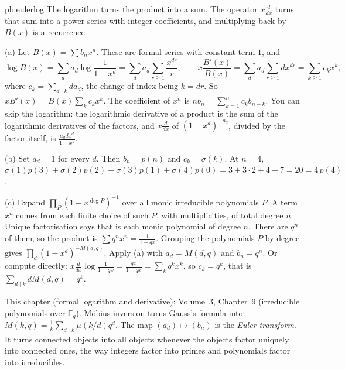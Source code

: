 \begin{solution}{pb:eulerlog}
\idea The logarithm turns the product into a sum. The operator $x\frac d{dx}$ turns that sum into a power series with integer coefficients, and multiplying back by $B(x)$ is a recurrence.

\writeup (a) Let $B(x)=\sum b_nx^n$. These are formal series with constant term $1$, and
\[
\log B(x)=\sum_da_d\log\frac1{1-x^d}=\sum_da_d\sum_{r\ge1}\frac{x^{dr}}r,\qquad x\frac{B'(x)}{B(x)}=\sum_da_d\sum_{r\ge1}dx^{dr}=\sum_{k\ge1}c_kx^k,
\]
where $c_k=\sum_{d\mid k}da_d$, the change of index being $k=dr$. So $xB'(x)=B(x)\sum_kc_kx^k$. The coefficient of $x^n$ is
$nb_n=\sum_{k=1}^nc_kb_{n-k}$. You can skip the logarithm: the logarithmic derivative of a product is the sum of the logarithmic
derivatives of the factors, and $x\frac d{dx}$ of $(1-x^d)^{-a_d}$, divided by the factor itself, is $\frac{a_ddx^d}{1-x^d}$.

(b) Set $a_d=1$ for every $d$. Then $b_n=p(n)$ and $c_k=\sigma(k)$. At $n=4$,
$\sigma(1)p(3)+\sigma(2)p(2)+\sigma(3)p(1)+\sigma(4)p(0)
=3+3\cdot2+4+7=20=4\,p(4)$.

(c) Expand $\prod_P(1-x^{\deg P})^{-1}$ over all monic irreducible polynomials $P$. A term $x^n$ comes from each finite choice of such $P$, with
multiplicities, of total degree $n$. Unique factorisation says that is each monic polynomial of degree $n$. There are $q^n$ of
them, so the product is $\sum q^nx^n=\frac1{1-qx}$. Grouping the polynomials $P$ by degree gives $\prod_d(1-x^d)^{-M(d,q)}$. Apply
(a) with $a_d=M(d,q)$ and $b_n=q^n$. Or compute directly: $x\frac{d}{dx}\log\frac1{1-qx}=\frac{qx}{1-qx}=\sum_kq^kx^k$, so $c_k=q^k$, that is
$\sum_{d\mid k}dM(d,q)=q^k$.

\tools This chapter (formal logarithm and derivative); Volume~3, Chapter~9 (irreducible polynomials over $\mathbb F_q$).
\leads Möbius inversion turns Gauss's formula into $M(k,q)=\frac1k\sum_{d\mid k}\mu(k/d)q^d$. The map $(a_d)\mapsto(b_n)$ is the
\emph{Euler transform}. It turns connected objects into all objects whenever the objects factor uniquely into connected ones,
the way integers factor into primes and polynomials factor into irreducibles.
\end{solution}

